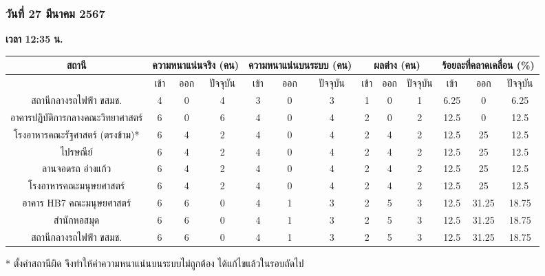 \subsubsection{วันที่ 27 มีนาคม 2567}
    \textbf{เวลา 12:35 น.}
    {\tiny\begin{center}
        \begin{tabular}{ | c | c | c | c | c | c | c | c | c | c | c | c | c |  }
            \hline
                \multirow{2}{*}{สถานี} & \multicolumn{3}{|c|}{ความหนาแน่นจริง (คน)} & \multicolumn{3}{|c|}{ความหนาแน่นบนระบบ (คน)} & \multicolumn{3}{|c|}{ผลต่าง (คน)} & \multicolumn{3}{|c|}{ร้อยละที่คลาดเคลื่อน (\%)} \\
            \hline
                & เข้า & ออก & ปัจจุบัน & เข้า & ออก & ปัจจุบัน & เข้า & ออก & ปัจจุบัน & เข้า & ออก & ปัจจุบัน \\
            \hline
                สถานีกลางรถไฟฟ้า ขสมช.            & 4 & 0 & 4 & 3 & 0 & 3 & 1 & 0 & 1 & 6.25 & 0 & 6.25 \\
                อาคารปฏิบัติการกลางคณะวิทยาศาสตร์    & 6 & 0 & 6 & 4 & 0 & 4 & 2 & 0 & 2 & 12.5 & 0 & 12.5 \\
                โรงอาหารคณะรัฐศาสตร์ (ตรงข้าม)*     & 6 & 4 & 2 & 4 & 0 & 4 & 2 & 4 & 2 & 12.5 & 25 & 12.5 \\
                ไปรษณีย์                          & 6 & 4 & 2 & 4 & 0 & 4 & 2 & 4 & 2 & 12.5 & 25 & 12.5 \\ 
                ลานจอดรถ อ่างแก้ว                  & 6 & 4 & 2 & 4 & 0 & 4 & 2 & 4 & 2 & 12.5 & 25 & 12.5 \\
                โรงอาหารคณะมนุษยศาสตร์            & 6 & 4 & 2 & 4 & 0 & 4 & 2 & 4 & 2 & 12.5 & 25 & 12.5 \\
                อาคาร HB7 คณะมนุษยศาสตร์          & 6 & 6 & 0 & 4 & 1 & 3 & 2 & 5 & 3 & 12.5 & 31.25 & 18.75 \\
                สำนักหอสมุด                       & 6 & 6 & 0 & 4 & 1 & 3 & 2 & 5 & 3 & 12.5 & 31.25 & 18.75 \\
                สถานีกลางรถไฟฟ้า ขสมช.            & 6 & 6 & 0 & 4 & 1 & 3 & 2 & 5 & 3 & 12.5 & 31.25 & 18.75 \\
            \hline
        \end{tabular}
    \end{center}}
    * ตั้งค่าสถานีผิด จึงทำให้ค่าความหนาแน่นบนระบบไม่ถูกต้อง ได้แก้ไขแล้วในรอบถัดไป

